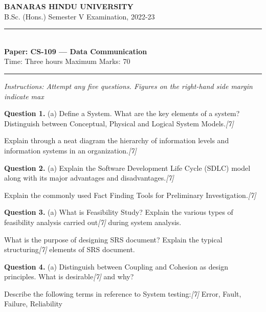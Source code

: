 \documentclass[11pt,a4paper]{article}
\newcommand{\pts}[1]{\hfill\textit{[#1]}}
\begin{document}
\begin{center}
  {\large\bfseries BANARAS HINDU UNIVERSITY}\\[2pt]
  {\normalsize B.Sc. (Hons.) Semester V Examination, 2022-23}\\[6pt]
  \rule{0.8\linewidth}{0.5pt}\\[6pt]
  {\large\bfseries Paper: CS-109 --- Data Communication}\\[4pt]
  {\normalsize Time: Three hours \hfill Maximum Marks: 70}
\end{center}

\rule{\linewidth}{0.4pt}

\smallskip
\noindent\textit{Instructions: Attempt any five questions. Figures on the right-hand side margin indicate max}

\bigskip

\medskip\noindent\textbf{Question 1.} (a) Define a System. What are the key elements of a system? Distinguish between Conceptual, Physical and Logical System Models.\pts{7}
\begin{parts}
  \item Explain through a neat diagram the hierarchy of information levels and information systems in an organization.\pts{7}
\end{parts}

\medskip\noindent\textbf{Question 2.} (a) Explain the Software Development Life Cycle (SDLC) model along with its major advantages and disadvantages.\pts{7}
\begin{parts}
  \item Explain the commonly used Fact Finding Tools for Preliminary Investigation.\pts{7}
\end{parts}

\medskip\noindent\textbf{Question 3.} (a) What is Feasibility Study? Explain the various types of feasibility analysis carried out\pts{7}
during system analysis.
\begin{parts}
  \item What is the purpose of designing SRS document? Explain the typical structuring\pts{7}
  elements of SRS document.
\end{parts}

\medskip\noindent\textbf{Question 4.} (a) Distinguish between Coupling and Cohesion as design principles. What is desirable\pts{7}
and why?
\begin{parts}
  \item Describe the following terms in reference to System testing:\pts{7}
  Error, Fault, Failure, Reliability
\end{parts}
\end{document}

